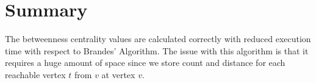 \section{Summary}
The betweenness centrality values are calculated correctly with reduced execution time with respect to Brandes' Algorithm.
The issue with this algorithm is that it requires a huge amount of space since we store count and distance for each reachable vertex $t$ from $v$ at vertex $v$.